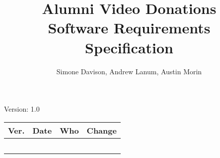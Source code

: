 \documentclass[letterpaper,12pt]{article}
\title{Alumni Video Donations\\Software Requirements Specification}
\author{Simone Davison, Andrew Lanum, Austin Morin}
\begin{document}
\maketitle

\begin{center}
  Version: 1.0
\end{center}

\vfill
\begin{tabularx}{\linewidth}{|l|l|l|X|}\hline
Ver. & Date & Who & Change \\\hline
     &      &     &        \\\hline
     &      &     &        \\\hline
     &      &     &        \\\hline
     &      &     &        \\\hline
     &      &     &        \\\hline
\end{tabularx}

\newpage







\appendix 



\end{document}
